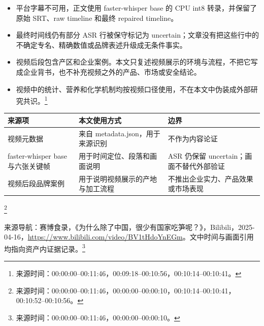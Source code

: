 \documentclass[UTF8,a4paper]{ctexart}
\begin{document}
\begin{itemize}
\setlength{\itemsep}{0.18em}\setlength{\parskip}{0.12em}
\item 平台字幕不可用，正文使用 faster-whisper base 的 CPU int8 转录，并保留了原始 SRT、raw timeline 和最终 repaired timeline。
\item 最终时间线仍有部分 ASR 行被保守标记为 uncertain；文章没有把这些行中的不确定专名、精确数值或品牌表述升级成无条件事实。
\item 视频后段包含产区和企业案例。本文只复述视频展示的环境与流程，不把它写成企业背书，也不补充视频之外的产品、市场或安全结论。
\item 视频中的统计、营养和化学机制均按视频口径使用，不在本文中伪装成外部研究共识。\footnote{来源时间：00:00:00--00:11:46，00:09:18--00:10:56，00:10:14--00:10:41。}
\end{itemize}

\begin{center}
\begin{tabularx}{\linewidth}{>{\raggedright\arraybackslash}X>{\raggedright\arraybackslash}X>{\raggedright\arraybackslash}X}
\hline
来源项 & 本文使用方式 & 边界\\
\hline
视频元数据 & 来自 metadata.json，用于来源识别 & 不作为内容论证\\
faster-whisper base 与六张关键帧 & 用于时间定位、段落和画面说明 & ASR 仍保留 uncertain；画面不替代外部验证\\
视频后段品牌案例 & 用于说明视频展示的产地与加工流程 & 不推出企业实力、产品效果或市场表现\\
\hline
\end{tabularx}
\end{center}
\footnote{来源时间：00:00:00--00:11:46，00:00:00--00:00:10，00:10:14--00:10:41，00:10:52--00:10:56。}

来源导航：赛博食录，《为什么除了中国，很少有国家吃笋呢？》，Bilibili，2025-04-16，\url{https://www.bilibili.com/video/BV1tHdoYnEGm}。文中时间与画面引用均指向资产内证据记录。\footnote{来源时间：00:00:00--00:11:46，00:00:00--00:00:10。}
\end{document}

